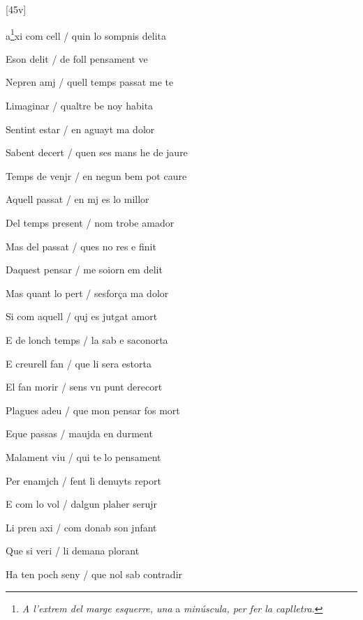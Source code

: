 




[45v]
\begin{estrofa}

 a\footnote{\textit{A l'extrem del marge esquerre, una }a \textit{min\'{u}scula,
per fer la caplletra}.}xi com cell / quin lo sompnis delita

 Eson delit / de foll pensament ve

 Nepren amj / quell temps passat me te

 Limaginar / qualtre be noy habita

 Sentint estar / en aguayt ma dolor

 Sabent decert / quen ses mans he de jaure

 Temps de venjr / en negun bem pot caure

 Aquell passat / en mj es lo millor

\end{estrofa}



\begin{estrofa}

 Del temps present / nom trobe amador

 Mas del passat / ques no res e finit

 Daquest pensar / me soiorn em delit

 Mas quant lo pert / sesfor\c{c}a ma dolor

 Si com aquell / quj es jutgat amort

 E de lonch temps / la sab e saconorta

 E creurell fan / que li sera estorta

 El fan morir / sens vn punt derecort

\end{estrofa}



\begin{estrofa}

 Plagues adeu / que mon pensar fos mort

 Eque passas / maujda en durment

 Malament viu / qui te lo pensament

 Per enamjch / fent li denuyts report

 E com lo vol / dalgun plaher serujr

 Li pren axi / com donab  son jnfant

 Que si veri / li demana plorant

 Ha ten poch seny / que nol sab contradir

\end{estrofa}



